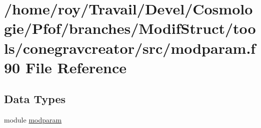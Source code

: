 \hypertarget{modparam_8f90}{\section{/home/roy/\-Travail/\-Devel/\-Cosmologie/\-Pfof/branches/\-Modif\-Struct/tools/conegravcreator/src/modparam.f90 File Reference}
\label{modparam_8f90}
}
\subsection*{Data Types}
\begin{DoxyCompactItemize}
\item 
module \hyperlink{classmodparam}{modparam}
\end{DoxyCompactItemize}
